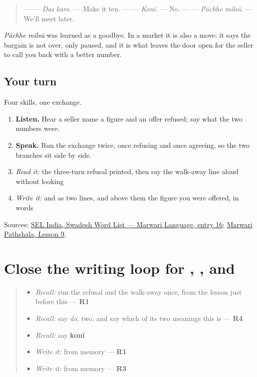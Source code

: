 \begin{quote}
— \textbf{ } — \emph{Das karo.} — Make it ten. — \textbf{} — \emph{Konī.} — No. — \textbf{ } — \emph{Pāchhe milsū.} — We'll meet later.
\end{quote}

\emph{Pāchhe milsū} was learned as a goodbye. In a market it is also a move: it says the bargain is not over, only paused, and it is what leaves the door open for the seller to call you back with a better number.

\subsection*{Your turn}
Four skills, one exchange.

\begin{enumerate}
\raggedright
  \item \textbf{Listen.} Hear a seller name a figure and an offer refused; say what the two numbers were.
  \item \textbf{Speak.} Run the exchange twice, once refusing and once agreeing, so the two branches sit side by side.
  \item \emph{Read it:} the three-turn refusal printed, then say the walk-away line aloud without looking
  \item \emph{Write it:} \textbf{} and \textbf{ } as two lines, and above them the figure you were offered, in words
\end{enumerate}

\begin{tcolorbox}[breakable,colback=teal!4,colframe=teal!35!black,title={Before you move on}]
Sources: \href{https://selindia.org/wp-content/uploads/2025/05/SWL-Marwari\_IPA.pdf}{SEL India, Swadesh Word List — Marwari Language, entry 16}; \href{https://www.marwaripathshala.com/marwari-lesson-9-english}{Marwari Pathshala, Lesson 9}.
\end{tcolorbox}
\section[Practice]{Close the writing loop for , ,  and }

\label{lesson:MW-R39-script-close}



\begin{quote}
\begin{itemize}
\raggedright
  \item \emph{Recall:} run the refusal and the walk-away once, from the lesson just before this — \textbf{R1}
  \item \emph{Recall:} say \emph{do}, two, and say which of its two meanings this is — \textbf{R4}
  \item \emph{Recall:} say \textbf{konī}
  \item \emph{Write it:} \textbf{} from memory — \textbf{R1}
  \item \emph{Write it:} \textbf{} from memory — \textbf{R3}
\end{itemize}
\end{quote}

